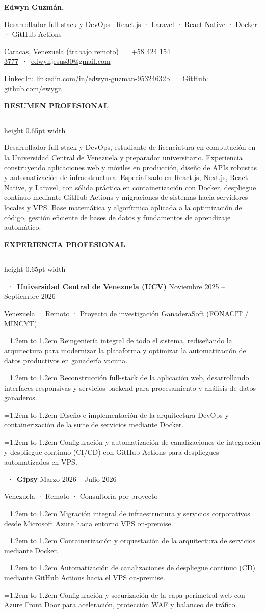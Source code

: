 \documentclass[10pt,a4paper]{article}
\makeatletter
\newlength{\SpaceAboveSection}
\newlength{\SpaceSectionTextToLine}
\newlength{\SpaceSectionLineToContent}
\newlength{\SpaceBetweenJobs}
\newlength{\SpaceJobTitleToSub}
\newlength{\SpaceJobSubToItems}
\newlength{\SpaceBetweenItems}
\newcommand{\cvName}{Edwyn Guzmán}
\newcommand{\cvRole}{Desarrollador full-stack y DevOps \textbar\ React.js · Laravel · React Native · Docker · GitHub Actions}
\newcommand{\cvLocation}{Caracas, Venezuela (trabajo remoto)}
\newcommand{\cvPhone}{+58 424 154 3777}
\newcommand{\cvPhoneLink}{+584241543777}
\newcommand{\cvEmail}{edwynjesus30@gmail.com}
\newcommand{\cvLinkedInUser}{linkedin.com/in/edwyn-guzman-95324632b}
\newcommand{\cvLinkedInLink}{https://linkedin.com/in/edwyn-guzman-95324632b}
\newcommand{\cvGitHubUser}{github.com/ewygn}
\newcommand{\cvGitHubLink}{https://github.com/ewygn}
\newcommand{\cvdot}{\textcolor{subsecondary}{~·~}}
\newcommand{\makecvheader}{%
  {\fontsize{24pt}{29pt}\bfseries \cvName{\color{dotaccent}.}}\par\vspace{0.26cm}%
  {\fontsize{10.2pt}{14.5pt}\color{subtext}\selectfont \cvRole}\par\vspace{0.22cm}%
  {\fontsize{9.4pt}{13.5pt}\color{subsecondary}\selectfont \cvLocation\cvdot\href{tel:\cvPhoneLink}{\color{subsecondary}\cvPhone}\cvdot\href{mailto:\cvEmail}{\color{dotaccent}\cvEmail}}\par\vspace{0.10cm}%
  {\fontsize{9.4pt}{13.5pt}\color{subsecondary}\selectfont LinkedIn: \href{\cvLinkedInLink}{\color{subsecondary}\cvLinkedInUser}\cvdot GitHub: \href{\cvGitHubLink}{\color{subsecondary}\cvGitHubUser}}\par%
}
\newcommand{\cvsection}[1]{%
  \vspace{\SpaceAboveSection}%
  {\color{accent}\bfseries\fontsize{10.2pt}{12pt}\addfontfeatures{LetterSpace=9.0}\selectfont #1}\par\nopagebreak%
  \vspace{\SpaceSectionTextToLine}%
  {\color{linecolor}\hrule height 0.65pt width \linewidth}\par\nopagebreak%
  \vspace{\SpaceSectionLineToContent}%
}
\newcommand{\cventry}[4]{%
  {\fontsize{9.8pt}{13.5pt}\selectfont{\bfseries #1}\cvdot{\color{accent}\bfseries #2} \hfill {\color{subsecondary}\small #4}}\par%
  \vspace{\SpaceJobTitleToSub}%
  {\color{subsecondary}\small #3}\par%
  \vspace{\SpaceJobSubToItems}%
}
\newcommand{\cvitem}[1]{%
  \par\hangindent=1.2em\hangafter=1\noindent
  \hbox to 1.2em{\raisebox{0.05ex}{\small\textbullet}\hss}%
  {\fontsize{9.6pt}{14.5pt}\selectfont #1}\par%
  \vspace{\SpaceBetweenItems}%
}
\newcommand{\jobsep}{\vspace{\SpaceBetweenJobs}}
\makeatother
\begin{document}
\color{textdark}


\makecvheader

\cvsection{RESUMEN PROFESIONAL}

{\fontsize{9.6pt}{14.8pt}\selectfont
  Desarrollador full-stack y DevOps, estudiante de licenciatura en computación en la Universidad Central de Venezuela y preparador universitario. Experiencia construyendo aplicaciones web y móviles en producción, diseño de APIs robustas y automatización de infraestructura. Especializado en React.js, Next.js, React Native, y Laravel, con sólida práctica en containerización con Docker, despliegue continuo mediante GitHub Actions y migraciones de sistemas hacia servidores locales y VPS. Base matemática y algorítmica aplicada a la optimización de código, gestión eficiente de bases de datos y fundamentos de aprendizaje automático.
}\par

\cvsection{EXPERIENCIA PROFESIONAL}

\cventry{Desarrollador full-stack y DevOps}{Universidad Central de Venezuela (UCV)}{Venezuela · Remoto · Proyecto de investigación GanaderaSoft (FONACIT / MINCYT)}{Noviembre 2025 – Septiembre 2026}
\cvitem{Reingeniería integral de todo el sistema, rediseñando la arquitectura para modernizar la plataforma y optimizar la automatización de datos productivos en ganadería vacuna.}
\cvitem{Reconstrucción full-stack de la aplicación web, desarrollando interfaces responsivas y servicios backend para procesamiento y análisis de datos ganaderos.}
\cvitem{Diseño e implementación de la arquitectura DevOps y containerización de la suite de servicios mediante Docker.}
\cvitem{Configuración y automatización de canalizaciones de integración y despliegue continuo (CI/CD) con GitHub Actions para despliegues automatizados en VPS.}

\jobsep

\cventry{Consultor DevOps y cloud}{Gipsy}{Venezuela · Remoto · Consultoría por proyecto}{Marzo 2026 – Julio 2026}
\cvitem{Migración integral de infraestructura y servicios corporativos desde Microsoft Azure hacia entorno VPS on-premise.}
\cvitem{Containerización y orquestación de la arquitectura de servicios mediante Docker.}
\cvitem{Automatización de canalizaciones de despliegue continuo (CD) mediante GitHub Actions hacia el VPS on-premise.}
\cvitem{Configuración y securización de la capa perimetral web con Azure Front Door para aceleración, protección WAF y balanceo de tráfico.}
\end{document}
